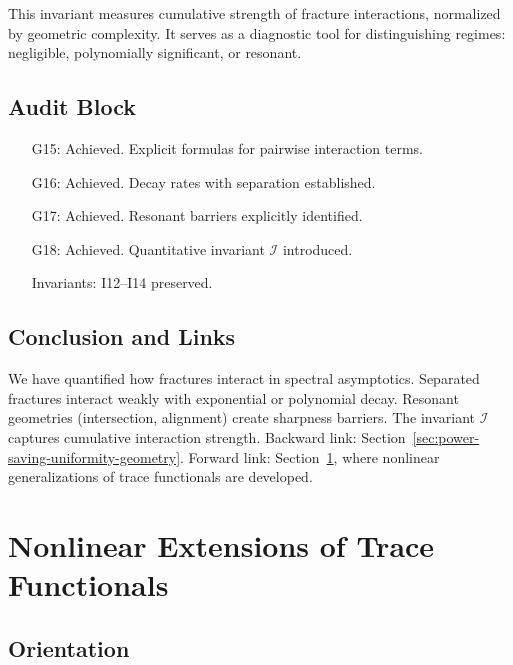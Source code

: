 \begin{remark}
This invariant measures cumulative strength of fracture interactions, normalized by geometric complexity. 
It serves as a diagnostic tool for distinguishing regimes: negligible, polynomially significant, or resonant. 
\end{remark}

\subsection*{Audit Block}

\begin{itemize}
  \item[G15:] Achieved. Explicit formulas for pairwise interaction terms. 
  \item[G16:] Achieved. Decay rates with separation established. 
  \item[G17:] Achieved. Resonant barriers explicitly identified. 
  \item[G18:] Achieved. Quantitative invariant $\mathcal{I}$ introduced. 
  \item[Invariants:] I12--I14 preserved. 
\end{itemize}

\subsection*{Conclusion and Links}

We have quantified how fractures interact in spectral asymptotics. 
Separated fractures interact weakly with exponential or polynomial decay. 
Resonant geometries (intersection, alignment) create sharpness barriers. 
The invariant $\mathcal{I}$ captures cumulative interaction strength. 
Backward link: Section~\ref{sec:power-saving-uniformity-geometry}. 
Forward link: Section~\ref{sec:nonlinear-extensions}, where nonlinear generalizations of trace functionals are developed. 

\section{Nonlinear Extensions of Trace Functionals}
\label{sec:nonlinear-extensions}

\subsection*{Orientation}

